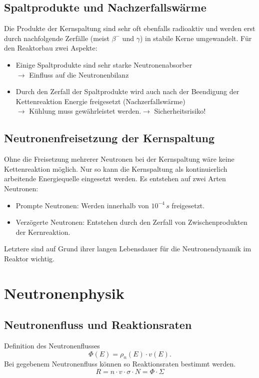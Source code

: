 \documentclass[11pt,a4paper]{article}
\begin{document}
\subsection{Spaltprodukte und Nachzerfallswärme}
Die Produkte der Kernspaltung sind sehr oft ebenfalls radioaktiv und werden erst durch nachfolgende Zerfälle (meist $\beta^-$ und $\gamma$) in stabile Kerne umgewandelt. Für den Reaktorbau zwei Aspekte:
\begin{itemize}
\item Einige Spaltprodukte sind sehr starke Neutronenabsorber \\$\rightarrow$ Einfluss auf die Neutronenbilanz
\item Durch den Zerfall der Spaltprodukte wird auch nach der Beendigung der Kettenreaktion  Energie freigesetzt (Nachzerfallswärme) \\$\rightarrow$ Kühlung muss gewährleistet werden.$\rightarrow$ Sicherheitsrisiko!
\end{itemize}
\subsection{Neutronenfreisetzung der Kernspaltung}
Ohne die Freisetzung mehrerer Neutronen bei der Kernspaltung wäre keine Kettenreaktion möglich. Nur so kann die Kernspaltung als kontinuierlich arbeitende Energiequelle eingesetzt werden. Es entstehen auf zwei Arten Neutronen:
\begin{itemize}
\item Prompte Neutronen: Werden innerhalb von $ 10^{-4}\,s $ freigesetzt.
\item Verzögerte Neutronen: Entstehen durch den Zerfall von Zwischenprodukten der Kernreaktion.
\end{itemize}
Letztere sind auf Grund ihrer langen Lebensdauer für die Neutronendynamik im Reaktor wichtig.
\section{Neutronenphysik}
\subsection{Neutronenfluss und Reaktionsraten}
Definition des Neutronenflusses 
\[
\Phi(E) = \rho_n(E) \cdot v(E).
\]
Bei gegebenem Neutronenfluss können so Reaktionsraten bestimmt werden.
\[
R = n\cdot v \cdot \sigma \cdot N = \Phi \cdot \Sigma 
\]
\end{document}
